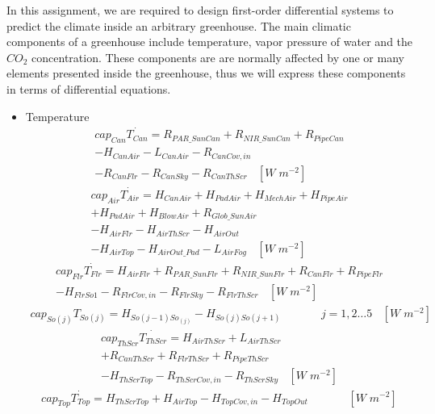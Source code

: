\documentclass[a4paper]{article}
\begin{document}
In this assignment, we are required to design first-order differential systems to predict the climate inside an arbitrary greenhouse.
The main climatic components of a greenhouse include temperature, vapor pressure of water and the \(CO_2\) concentration.
These components are are normally affected by one or many elements presented inside the greenhouse, thus we will express these components in terms of differential equations.
\begin{itemize}
  \item Temperature
        \begin{multline*}
          cap_{Can}\dot{T_{Can}} = {}R_{PAR\_SunCan} + R_{NIR\_SunCan} + R_{PipeCan} \\
          - H_{CanAir} - L_{CanAir} - R_{CanCov,in} \\
          - R_{CanFlr} - R_{CanSky} - R_{CanThScr} ~~~~ [W\;m^{-2}]
        \end{multline*}
        \begin{multline*}
          cap_{Air}\dot{T_{Air}} = H_{CanAir} + H_{PadAir} + H_{MechAir} + H_{PipeAir} \\
          + H_{PadAir} + H_{BlowAir} + R_{Glob\_SunAir} \\
          - H_{AirFlr} - H_{AirThScr} - H_{AirOut} \\
          - H_{AirTop} - H_{AirOut\_Pad} - L_{AirFog} ~~~~ [W\;m^{-2}]
        \end{multline*}
        \begin{multline*}
          cap_{Flr}\dot{T_{Flr}} = H_{AirFlr} + R_{PAR\_SunFlr} + R_{NIR\_SunFlr} + R_{CanFlr} + R_{PipeFlr} \\
          - H_{FlrSo1} - R_{FlrCov,in} - R_{FlrSky} - R_{FlrThScr} ~~~~ [W\;m^{-2}]
        \end{multline*}
        \begin{multline*}
          cap_{So(j)}T_{So(j)} = H_{So(j-1)So_{(j)}} - H_{So(j)So(j+1)} ~~~~~~~~~~~~~~~~ j=1,2\dots5 ~~~~ [W\;m^{-2}]
        \end{multline*}
        \begin{multline*}
          cap_{ThScr}\dot{T_{ThScr}} = H_{AirThScr} + L_{AirThScr} \\
          + R_{CanThScr} + R_{FlrThScr} + R_{PipeThScr} \\
          - H_{ThScrTop} - R_{ThScrCov,in} - R_{ThScrSky} ~~~~ [W\;m^{-2}]
        \end{multline*}
        \begin{multline*}
          cap_{Top}\dot{T_{Top}} = H_{ThScrTop} + H_{AirTop} - H_{TopCov,in} - H_{TopOut} ~~~~~~~~~~~~~~~~ [W\;m^{-2}]

\end{multline*}
\end{itemize}
\end{document}
